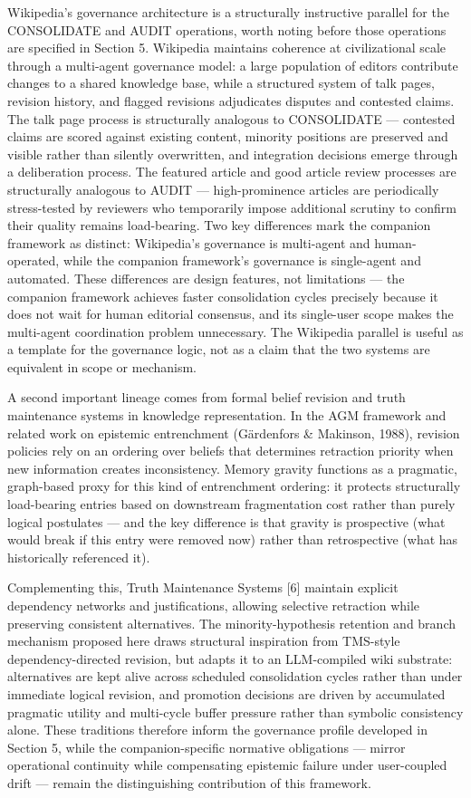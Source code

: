 \documentclass[
  11pt,
]{article}
\begin{document}
Wikipedia's governance architecture is a structurally instructive
parallel for the CONSOLIDATE and AUDIT operations, worth noting before
those operations are specified in Section 5. Wikipedia maintains
coherence at civilizational scale through a multi-agent governance
model: a large population of editors contribute changes to a shared
knowledge base, while a structured system of talk pages, revision
history, and flagged revisions adjudicates disputes and contested
claims. The talk page process is structurally analogous to CONSOLIDATE
--- contested claims are scored against existing content, minority
positions are preserved and visible rather than silently overwritten,
and integration decisions emerge through a deliberation process. The
featured article and good article review processes are structurally
analogous to AUDIT --- high-prominence articles are periodically
stress-tested by reviewers who temporarily impose additional scrutiny to
confirm their quality remains load-bearing. Two key differences mark the
companion framework as distinct: Wikipedia's governance is multi-agent
and human-operated, while the companion framework's governance is
single-agent and automated. These differences are design features, not
limitations --- the companion framework achieves faster consolidation
cycles precisely because it does not wait for human editorial consensus,
and its single-user scope makes the multi-agent coordination problem
unnecessary. The Wikipedia parallel is useful as a template for the
governance logic, not as a claim that the two systems are equivalent in
scope or mechanism.

A second important lineage comes from formal belief revision and truth
maintenance systems in knowledge representation. In the AGM framework
and related work on epistemic entrenchment (Gärdenfors \& Makinson,
1988), revision policies rely on an ordering over beliefs that
determines retraction priority when new information creates
inconsistency. Memory gravity functions as a pragmatic, graph-based
proxy for this kind of entrenchment ordering: it protects structurally
load-bearing entries based on downstream fragmentation cost rather than
purely logical postulates --- and the key difference is that gravity is
prospective (what would break if this entry were removed now) rather
than retrospective (what has historically referenced it).

Complementing this, Truth Maintenance Systems {[}6{]} maintain explicit
dependency networks and justifications, allowing selective retraction
while preserving consistent alternatives. The minority-hypothesis
retention and branch mechanism proposed here draws structural
inspiration from TMS-style dependency-directed revision, but adapts it
to an LLM-compiled wiki substrate: alternatives are kept alive across
scheduled consolidation cycles rather than under immediate logical
revision, and promotion decisions are driven by accumulated pragmatic
utility and multi-cycle buffer pressure rather than symbolic consistency
alone. These traditions therefore inform the governance profile
developed in Section 5, while the companion-specific normative
obligations --- mirror operational continuity while compensating
epistemic failure under user-coupled drift --- remain the distinguishing
contribution of this framework.
\end{document}
